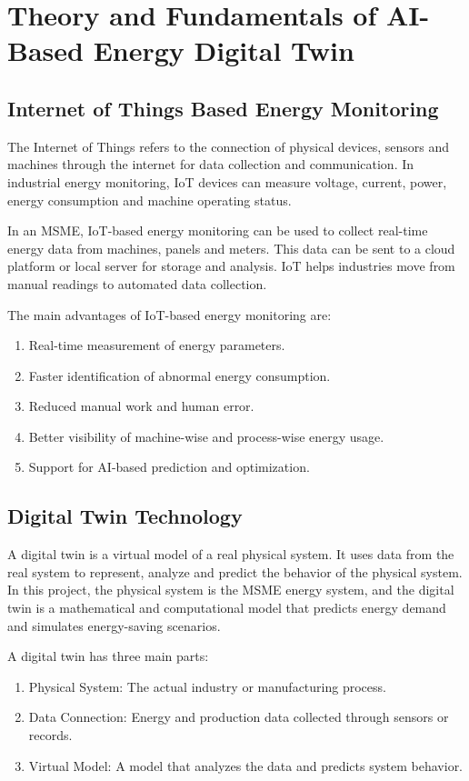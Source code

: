 \chapter{Theory and Fundamentals of AI-Based Energy Digital Twin}
\label{chap:theory}

\section{Internet of Things Based Energy Monitoring}
The Internet of Things refers to the connection of physical devices, sensors and machines through the internet for data collection and communication. In industrial energy monitoring, IoT devices can measure voltage, current, power, energy consumption and machine operating status.

In an MSME, IoT-based energy monitoring can be used to collect real-time energy data from machines, panels and meters. This data can be sent to a cloud platform or local server for storage and analysis. IoT helps industries move from manual readings to automated data collection.

The main advantages of IoT-based energy monitoring are:
\begin{enumerate}
    \item Real-time measurement of energy parameters.
    \item Faster identification of abnormal energy consumption.
    \item Reduced manual work and human error.
    \item Better visibility of machine-wise and process-wise energy usage.
    \item Support for AI-based prediction and optimization.
\end{enumerate}

\section{Digital Twin Technology}
A digital twin is a virtual model of a real physical system. It uses data from the real system to represent, analyze and predict the behavior of the physical system. In this project, the physical system is the MSME energy system, and the digital twin is a mathematical and computational model that predicts energy demand and simulates energy-saving scenarios.

A digital twin has three main parts:
\begin{enumerate}
    \item Physical System: The actual industry or manufacturing process.
    \item Data Connection: Energy and production data collected through sensors or records.
    \item Virtual Model: A model that analyzes the data and predicts system behavior.
\end{enumerate}

